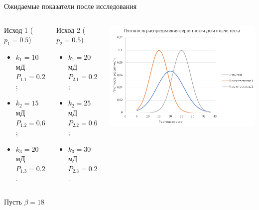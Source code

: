 \begin{frame}{Ожидаемые показатели после исследования}
	\begin{columns}
		\begin{column}{0.2\textwidth}
			\begin{center}
				Исход 1 ($p_1 = 0.5$)
				
				\begin{itemize}
					\item $k_1 = 10$ мД   $P_{1.1} = 0.2$; 
					\item $k_2 = 15$ мД   $P_{1.2} = 0.6$; 
					\item $k_3 = 20$ мД   $P_{1.3} = 0.2$. 
				\end{itemize}
			\end{center}
		\end{column}
		\begin{column}{0.2\textwidth}
			\begin{center}
				Исход 2 ($p_2 = 0.5$)
				
				\begin{itemize}
					\item $k_1 = 20$ мД   $P_{2.1} = 0.2$; 
					\item $k_2 = 25$ мД   $P_{2.2} = 0.6$; 
					\item $k_3 = 30$ мД   $P_{2.3} = 0.2$. 
				\end{itemize}
			\end{center}
		\end{column}
		\begin{column}{0.6\textwidth}
			\begin{center}
				\includegraphics[width=1\textwidth]{pics_2/norm_distribution_ex1}
			\end{center}
		\end{column}
	\end{columns}
	
	Пусть $\beta = 18$
\end{frame}	

